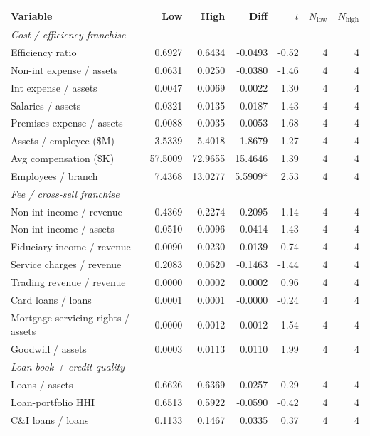 \begin{tabular}{lrrrrrr}
\toprule
Variable & Low & High & Diff & $t$ & $N_{\text{low}}$ & $N_{\text{high}}$ \\
\midrule
\multicolumn{7}{l}{\emph{Cost / efficiency franchise}} \\
\midrule
Efficiency ratio & 0.6927 & 0.6434 & -0.0493 & -0.52 & 4 & 4 \\
Non-int expense / assets & 0.0631 & 0.0250 & -0.0380 & -1.46 & 4 & 4 \\
Int expense / assets & 0.0047 & 0.0069 & 0.0022 & 1.30 & 4 & 4 \\
Salaries / assets & 0.0321 & 0.0135 & -0.0187 & -1.43 & 4 & 4 \\
Premises expense / assets & 0.0088 & 0.0035 & -0.0053 & -1.68 & 4 & 4 \\
Assets / employee (\$M) & 3.5339 & 5.4018 & 1.8679 & 1.27 & 4 & 4 \\
Avg compensation (\$K) & 57.5009 & 72.9655 & 15.4646 & 1.39 & 4 & 4 \\
Employees / branch & 7.4368 & 13.0277 & 5.5909* & 2.53 & 4 & 4 \\
\midrule
\multicolumn{7}{l}{\emph{Fee / cross-sell franchise}} \\
\midrule
Non-int income / revenue & 0.4369 & 0.2274 & -0.2095 & -1.14 & 4 & 4 \\
Non-int income / assets & 0.0510 & 0.0096 & -0.0414 & -1.43 & 4 & 4 \\
Fiduciary income / revenue & 0.0090 & 0.0230 & 0.0139 & 0.74 & 4 & 4 \\
Service charges / revenue & 0.2083 & 0.0620 & -0.1463 & -1.44 & 4 & 4 \\
Trading revenue / revenue & 0.0000 & 0.0002 & 0.0002 & 0.96 & 4 & 4 \\
Card loans / loans & 0.0001 & 0.0001 & -0.0000 & -0.24 & 4 & 4 \\
Mortgage servicing rights / assets & 0.0000 & 0.0012 & 0.0012 & 1.54 & 4 & 4 \\
Goodwill / assets & 0.0003 & 0.0113 & 0.0110 & 1.99 & 4 & 4 \\
\midrule
\multicolumn{7}{l}{\emph{Loan-book + credit quality}} \\
\midrule
Loans / assets & 0.6626 & 0.6369 & -0.0257 & -0.29 & 4 & 4 \\
Loan-portfolio HHI & 0.6513 & 0.5922 & -0.0590 & -0.42 & 4 & 4 \\
C\&I loans / loans & 0.1133 & 0.1467 & 0.0335 & 0.37 & 4 & 4 \\

\end{tabular}
